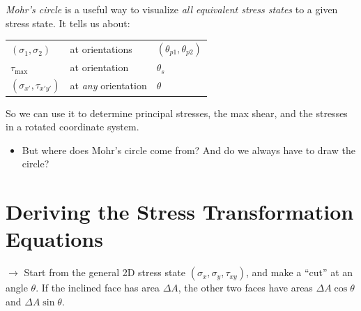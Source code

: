 \documentclass[11pt]{article}
\begin{document}
\bigskip
\noindent
\emph{Mohr's circle} is a useful way to visualize \emph{all equivalent stress states} to a
given stress state. It tells us about:

\begin{center}
\renewcommand{\arraystretch}{1.3}
\begin{tabular}{l @{\qquad} l @{\quad} l}
  $(\sigma_1, \sigma_2)$ & at orientations & $(\theta_{p1}, \theta_{p2})$ \\
  $\tau_{\max}$ & at orientation & $\theta_s$ \\
  $(\sigma_{x'}, \tau_{x'y'})$ & at \emph{any} orientation & $\theta$
\end{tabular}
\end{center}

\noindent
So we can use it to determine principal stresses, the max shear, and the stresses in a
rotated coordinate system.

\begin{itemize}[label=$\rightarrow$]
  \item But where does Mohr's circle come from? And do we always have to draw the circle?
\end{itemize}

\section*{Deriving the Stress Transformation Equations}

\noindent
$\rightarrow$ Start from the general 2D stress state $(\sigma_x, \sigma_y, \tau_{xy})$, and
make a ``cut'' at an angle $\theta$. If the inclined face has area $\Delta A$, the other two
faces have areas $\Delta A\cos\theta$ and $\Delta A\sin\theta$.
\end{document}

